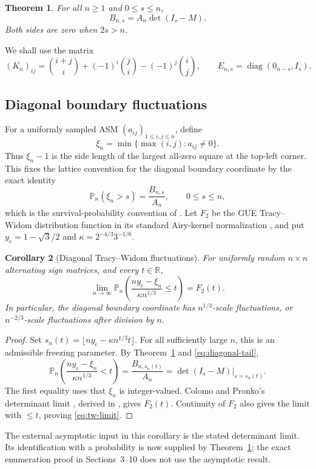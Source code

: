 \documentclass[11pt,a4paper]{amsart}
\newtheorem{theorem}{Theorem}[section]
\newtheorem{corollary}[theorem]{Corollary}
\theoremstyle{remark}\newtheorem{remark}[theorem]{Remark}
\numberwithin{equation}{section}
\DeclareMathOperator{\diag}{diag}
\begin{document}
\begin{theorem}\label{thm:main}
For all $n\ge1$ and $0\le s\le n$,
\begin{equation}\label{eq:main}
 B_{n,s}=A_n\det(I_s-M).
\end{equation}
Both sides are zero when $2s>n$.
\end{theorem}
We shall use the matrix
\begin{equation}\label{eq:K}
 (K_n)_{ij}=\binom{i+j}{i}+(-1)^i\binom ji-(-1)^j\binom ij,
 \qquad E_{n,s}=\diag(0_{n-s},I_s).
\end{equation}


\subsection*{Diagonal boundary fluctuations}
For a uniformly sampled ASM $(a_{ij})_{1\le i,j\le n}$, define
\[
 \xi_n=\min\{\max(i,j):a_{ij}\ne0\}.
\]
Thus $\xi_n-1$ is the side length of the largest all-zero square at the top-left corner. This fixes the lattice convention for the diagonal boundary coordinate by the exact identity
\begin{equation}\label{eq:diagonal-tail}
 \mathbb P_n(\xi_n>s)=\frac{B_{n,s}}{A_n},\qquad 0\le s\le n,
\end{equation}
which is the survival-probability convention of \cite[(4.3)]{CP}. Let $F_2$ be the GUE Tracy--Widom distribution function in its standard Airy-kernel normalization \cite{TW}, and put $y_{\mathrm c}=1-\sqrt3/2$ and $\kappa=2^{-4/3}3^{-1/6}$.

\begin{corollary}[Diagonal Tracy--Widom fluctuations]\label{cor:tw}
For uniformly random $n\times n$ alternating sign matrices, and every $t\in\mathbb R$,
\begin{equation}\label{eq:tw-limit}
 \lim_{n\to\infty}\mathbb P_n\left(
 \frac{ny_{\mathrm c}-\xi_n}{\kappa n^{1/3}}\le t\right)=F_2(t).
\end{equation}
In particular, the diagonal boundary coordinate has $n^{1/3}$-scale fluctuations, or $n^{-2/3}$-scale fluctuations after division by $n$.
\end{corollary}
\begin{proof}
Set $s_n(t)=\lfloor ny_{\mathrm c}-\kappa n^{1/3}t\rfloor$. For all sufficiently large $n$, this is an admissible freezing parameter. By Theorem~\ref{thm:main} and \eqref{eq:diagonal-tail},
\[
 \mathbb P_n\left(\frac{ny_{\mathrm c}-\xi_n}{\kappa n^{1/3}}<t\right)
 =\frac{B_{n,s_n(t)}}{A_n}
 =\left.\det(I_s-M)\right|_{s=s_n(t)}.
\]
The first equality uses that $\xi_n$ is integer-valued. Colomo and Pronko's determinant limit \cite[Theorem~4, (4.4)]{CP}, derived in \cite[Section~4.4]{CP24}, gives $F_2(t)$. Continuity of $F_2$ also gives the limit with $\le t$, proving \eqref{eq:tw-limit}.
\end{proof}
The external asymptotic input in this corollary is the stated determinant limit. Its identification with a probability is now supplied by Theorem~\ref{thm:main}; the exact enumeration proof in Sections~3--10 does not use the asymptotic result.
\end{document}
